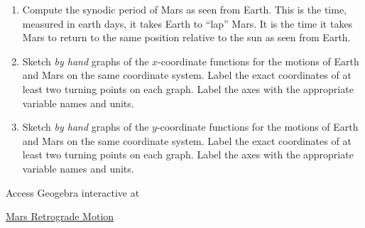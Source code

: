 \documentclass{ximera}
\begin{document}
\begin{exploration}
\begin{enumerate}
\item Compute the synodic period of Mars as seen from Earth. This is the time, measured in earth days, it takes Earth to ``lap'' Mars. It is the time it takes Mars to return to the same position relative to the sun as seen from Earth. 

\item Sketch \emph{by hand} graphs of the $x$-coordinate functions for the motions of Earth and Mars on the same coordinate system. Label the exact coordinates of at least two turning points on each graph. Label the axes with the appropriate variable names and units.

\item Sketch \emph{by hand} graphs of the $y$-coordinate functions for the motions of Earth and Mars on the same coordinate system. Label the exact coordinates of at least two turning points on each graph. Label the axes with the appropriate variable names and units.

\end{enumerate}

Access Geogebra interactive at
 
\href{https://www.geogebra.org/classic/addm38j6}{Mars Retrograde Motion}

 
\begin{onlineOnly}
    \begin{center}
\end{center}
\end{onlineOnly}



\end{exploration}
\end{document}
